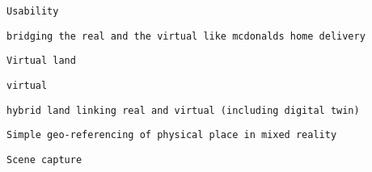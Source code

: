        
     

     
     
      \protect\hypertarget{ID_1784721357}{}{}

\begin{verbatim}
Usability
\end{verbatim}

       
       
        \protect\hypertarget{ID_614251261}{}{}

\begin{verbatim}
bridging the real and the virtual like mcdonalds home delivery
\end{verbatim}
       
     

     
     
      \protect\hypertarget{ID_1618115041}{}{}

\begin{verbatim}
Virtual land
\end{verbatim}

       
       
        \protect\hypertarget{ID_1758826159}{}{}

\begin{verbatim}
virtual
\end{verbatim}
       

       
       
        \protect\hypertarget{ID_1982592978}{}{}

\begin{verbatim}
hybrid land linking real and virtual (including digital twin)
\end{verbatim}
       

       
       
        \protect\hypertarget{ID_272762383}{}{}

\begin{verbatim}
Simple geo-referencing of physical place in mixed reality
\end{verbatim}
       
     
   

   
   
    \protect\hypertarget{ID_1702865502}{}{}

\begin{verbatim}
Scene capture
\end{verbatim}

     
     
      \protect\hypertarget{ID_1365164684}{}{}

